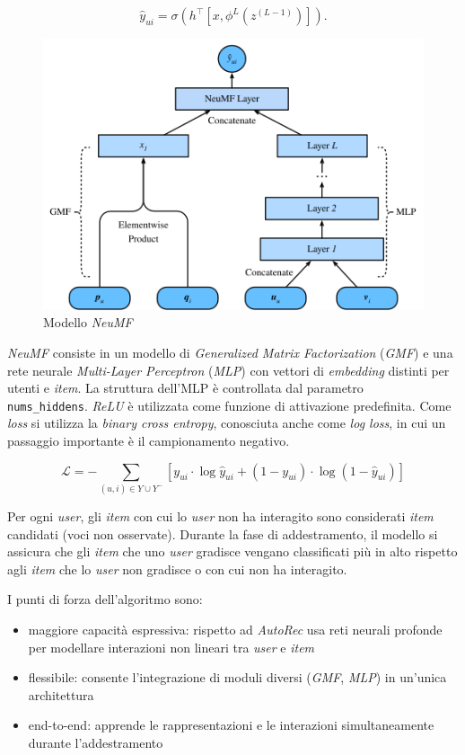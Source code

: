 \[
\hat{y}_{ui} = \sigma(h^\top[x, \phi^L(z^{(L-1)})]).
\]

\begin{figure}[htbp]
    \centering
    \includegraphics[scale=0.6]{figures/algorithms/neu_mf.png}
    \caption{Modello \textit{NeuMF}}
    \label{fig:neu_mf}
\end{figure}

\textit{NeuMF} consiste in un modello di \textit{Generalized Matrix Factorization} (\textit{GMF}) e una rete neurale \textit{Multi-Layer Perceptron} (\textit{MLP}) con vettori di \textit{embedding} distinti per utenti e \textit{item}. La struttura dell'MLP è controllata dal parametro \\ \texttt{nums\_hiddens}. \textit{ReLU} è utilizzata come funzione di attivazione predefinita. Come \textit{loss} si utilizza la \textit{binary cross entropy}, conosciuta anche come \textit{log loss}, in cui un passaggio importante è il campionamento negativo.

\[
\mathcal{L} = -\sum_{(u,i) \in Y \cup Y^{-}} \left[ y_{ui} \cdot \log \hat{y}_{ui} + (1 - y_{ui}) \cdot \log(1 - \hat{y}_{ui}) \right]
\]

Per ogni \textit{user}, gli \textit{item} con cui lo \textit{user} non ha interagito sono considerati \textit{item} candidati (voci non osservate). Durante la fase di addestramento, il modello si assicura che gli \textit{item} che uno \textit{user} gradisce vengano classificati più in alto rispetto agli \textit{item} che lo \textit{user} non gradisce o con cui non ha interagito.

I punti di forza dell'algoritmo sono:

\begin{itemize}
  \item maggiore capacità espressiva: rispetto ad \textit{AutoRec} usa reti neurali profonde per modellare interazioni non lineari tra \textit{user} e \textit{item}
  \item flessibile: consente l'integrazione di moduli diversi (\textit{GMF}, \textit{MLP}) in un'unica architettura
  \item end-to-end: apprende le rappresentazioni e le interazioni simultaneamente durante l'addestramento
\end{itemize}

